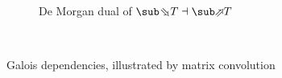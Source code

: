 \begin{figure}
\begin{subfigure}{0.46\textwidth}
      \vspace{2mm}
      \caption{De Morgan dual of $\evalBwdF{T} \adjoint \evalFwdF{T}$}
   \end{subfigure}\\
   \vspace{5mm}
   \begin{subfigure}[t]{3.3in}
      \small
      
   \end{subfigure}
   \begin{subfigure}[t]{2.1in}
      \small
      
   \end{subfigure}
   \caption{Galois dependencies, illustrated by matrix convolution}
\end{figure}
